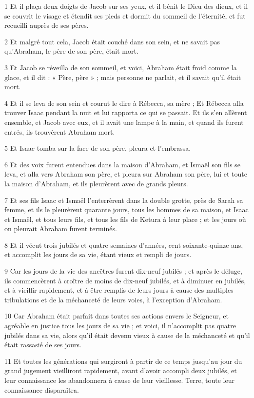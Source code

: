 \par 1 Et il plaça deux doigts de Jacob sur ses yeux, et il bénit le Dieu des dieux, et il se couvrit le visage et étendit ses pieds et dormit du sommeil de l'éternité, et fut recueilli auprès de ses pères.
\par 2 Et malgré tout cela, Jacob était couché dans son sein, et ne savait pas qu'Abraham, le père de son père, était mort.
\par 3 Et Jacob se réveilla de son sommeil, et voici, Abraham était froid comme la glace, et il dit : « Père, père » ; mais personne ne parlait, et il savait qu'il était mort.
\par 4 Et il se leva de son sein et courut le dire à Rébecca, sa mère ; Et Rébecca alla trouver Isaac pendant la nuit et lui rapporta ce qui se passait. Et ils s'en allèrent ensemble, et Jacob avec eux, et il avait une lampe à la main, et quand ils furent entrés, ils trouvèrent Abraham mort.
\par 5 Et Isaac tomba sur la face de son père, pleura et l'embrassa.
\par 6 Et des voix furent entendues dans la maison d'Abraham, et Ismaël son fils se leva, et alla vers Abraham son père, et pleura sur Abraham son père, lui et toute la maison d'Abraham, et ils pleurèrent avec de grands pleurs.
\par 7 Et ses fils Isaac et Ismaël l'enterrèrent dans la double grotte, près de Sarah sa femme, et ils le pleurèrent quarante jours, tous les hommes de sa maison, et Isaac et Ismaël, et tous leurs fils, et tous les fils de Ketura à leur place ; et les jours où on pleurait Abraham furent terminés.
\par 8 Et il vécut trois jubilés et quatre semaines d'années, cent soixante-quinze ans, et accomplit les jours de sa vie, étant vieux et rempli de jours.
\par 9 Car les jours de la vie des ancêtres furent dix-neuf jubilés ; et après le déluge, ils commencèrent à croître de moins de dix-neuf jubilés, et à diminuer en jubilés, et à vieillir rapidement, et à être remplis de leurs jours à cause des multiples tribulations et de la méchanceté de leurs voies, à l'exception d'Abraham.
\par 10 Car Abraham était parfait dans toutes ses actions envers le Seigneur, et agréable en justice tous les jours de sa vie ; et voici, il n'accomplit pas quatre jubilés dans sa vie, alors qu'il était devenu vieux à cause de la méchanceté et qu'il était rassasié de ses jours.
\par 11 Et toutes les générations qui surgiront à partir de ce temps jusqu'au jour du grand jugement vieilliront rapidement, avant d'avoir accompli deux jubilés, et leur connaissance les abandonnera à cause de leur vieillesse. Terre, toute leur connaissance disparaîtra.
